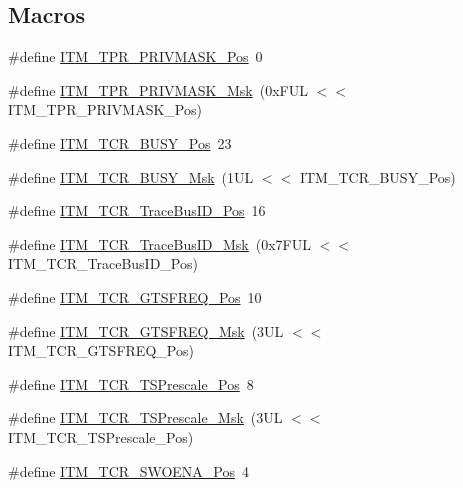 \subsection*{Macros}
\begin{DoxyCompactItemize}
\item 
\#define \hyperlink{group__CMSIS__ITM_ga7abe5e590d1611599df87a1884a352e8}{I\-T\-M\-\_\-\-T\-P\-R\-\_\-\-P\-R\-I\-V\-M\-A\-S\-K\-\_\-\-Pos}~0
\item 
\#define \hyperlink{group__CMSIS__ITM_ga168e089d882df325a387aab3a802a46b}{I\-T\-M\-\_\-\-T\-P\-R\-\_\-\-P\-R\-I\-V\-M\-A\-S\-K\-\_\-\-Msk}~(0x\-F\-U\-L $<$$<$ I\-T\-M\-\_\-\-T\-P\-R\-\_\-\-P\-R\-I\-V\-M\-A\-S\-K\-\_\-\-Pos)
\item 
\#define \hyperlink{group__CMSIS__ITM_ga9174ad4a36052c377cef4e6aba2ed484}{I\-T\-M\-\_\-\-T\-C\-R\-\_\-\-B\-U\-S\-Y\-\_\-\-Pos}~23
\item 
\#define \hyperlink{group__CMSIS__ITM_ga43ad7cf33de12f2ef3a412d4f354c60f}{I\-T\-M\-\_\-\-T\-C\-R\-\_\-\-B\-U\-S\-Y\-\_\-\-Msk}~(1\-U\-L $<$$<$ I\-T\-M\-\_\-\-T\-C\-R\-\_\-\-B\-U\-S\-Y\-\_\-\-Pos)
\item 
\#define \hyperlink{group__CMSIS__ITM_gaca0281de867f33114aac0636f7ce65d3}{I\-T\-M\-\_\-\-T\-C\-R\-\_\-\-Trace\-Bus\-I\-D\-\_\-\-Pos}~16
\item 
\#define \hyperlink{group__CMSIS__ITM_ga60c20bd9649d1da5a2be8e656ba19a60}{I\-T\-M\-\_\-\-T\-C\-R\-\_\-\-Trace\-Bus\-I\-D\-\_\-\-Msk}~(0x7\-F\-U\-L $<$$<$ I\-T\-M\-\_\-\-T\-C\-R\-\_\-\-Trace\-Bus\-I\-D\-\_\-\-Pos)
\item 
\#define \hyperlink{group__CMSIS__ITM_ga96c7c7cbc0d98426c408090b41f583f1}{I\-T\-M\-\_\-\-T\-C\-R\-\_\-\-G\-T\-S\-F\-R\-E\-Q\-\_\-\-Pos}~10
\item 
\#define \hyperlink{group__CMSIS__ITM_gade862cf009827f7f6748fc44c541b067}{I\-T\-M\-\_\-\-T\-C\-R\-\_\-\-G\-T\-S\-F\-R\-E\-Q\-\_\-\-Msk}~(3\-U\-L $<$$<$ I\-T\-M\-\_\-\-T\-C\-R\-\_\-\-G\-T\-S\-F\-R\-E\-Q\-\_\-\-Pos)
\item 
\#define \hyperlink{group__CMSIS__ITM_gad7bc9ee1732032c6e0de035f0978e473}{I\-T\-M\-\_\-\-T\-C\-R\-\_\-\-T\-S\-Prescale\-\_\-\-Pos}~8
\item 
\#define \hyperlink{group__CMSIS__ITM_ga7a723f71bfb0204c264d8dbe8cc7ae52}{I\-T\-M\-\_\-\-T\-C\-R\-\_\-\-T\-S\-Prescale\-\_\-\-Msk}~(3\-U\-L $<$$<$ I\-T\-M\-\_\-\-T\-C\-R\-\_\-\-T\-S\-Prescale\-\_\-\-Pos)
\item 
\#define \hyperlink{group__CMSIS__ITM_ga7a380f0c8078f6560051406583ecd6a5}{I\-T\-M\-\_\-\-T\-C\-R\-\_\-\-S\-W\-O\-E\-N\-A\-\_\-\-Pos}~4
$$
\end{DoxyCompactItemize}
